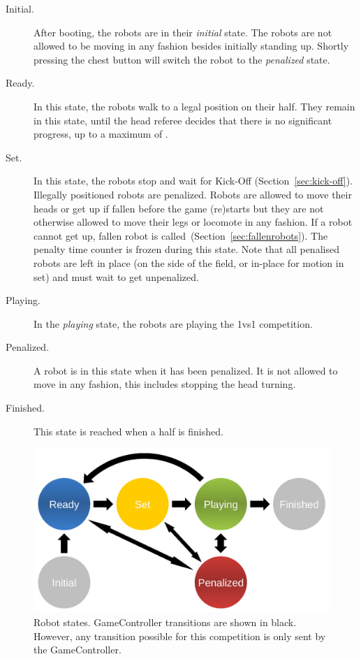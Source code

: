 \begin{description}
	\item[Initial.] After booting, the robots are in their \emph{initial} state. The robots are not allowed to be moving in any fashion besides initially standing up. Shortly pressing the chest button will switch the robot to the \emph{penalized} state.
	
	\item[Ready.] In this state, the robots walk to a legal position on their half. They remain in this state, until the head referee decides that there is no significant progress, up to a maximum of \KickOffAutoTime.
	
	\item[Set.] In this state, the robots stop and wait for Kick-Off  (\cf Section~\ref{sec:kick-off}).
	Illegally positioned robots are penalized.
	Robots are allowed to move their heads or get up if fallen before the game (re)starts but they are not otherwise allowed to move their legs or locomote in any fashion.
	If a robot cannot get up, fallen robot is called~(\cf Section~\ref{sec:fallenrobots}).
	The penalty time counter is frozen during this state.
	Note that all penalised robots are left in place (on the side of the field, or in-place for motion in set) and must wait to get unpenalized.
	
	\item[Playing.] In the \emph{playing} state, the robots are playing the 1vs1 competition.
	
	\item[Penalized.] A robot is in this state when it has been penalized. It is not allowed to move in any fashion,  this includes stopping the head turning.
	
	\item[Finished.] This state is reached when a half is finished.
\end{description}

\begin{figure}[t]
	\centerline{\includegraphics[width=0.9\columnwidth]{figs/states.pdf}}
	\caption{Robot states. GameController transitions are shown in black. However, any transition possible for this competition is only sent by the GameController.}
	\label{fig:robot_states}
\end{figure}

